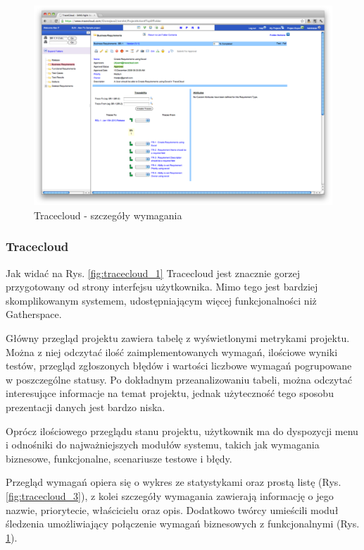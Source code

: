         \begin{figure}[t]
          \centering
          \includegraphics[width=1.0\textwidth]{img/tracecloud_4.pdf}
          \caption{Tracecloud - szczegóły wymagania}
          \label{fig:tracecloud_4}
        \end{figure}

      \subsubsection{Tracecloud}
        
        Jak widać na Rys. \ref{fig:tracecloud_1} Tracecloud jest znacznie gorzej przygotowany od strony interfejsu użytkownika. Mimo tego jest bardziej skomplikowanym systemem, udostępniającym więcej funkcjonalności niż Gatherspace.

        Główny przegląd projektu zawiera tabelę z wyświetlonymi metrykami projektu. Można z niej odczytać ilość zaimplementowanych wymagań, ilościowe wyniki testów, przegląd zgłoszonych błędów i wartości liczbowe wymagań pogrupowane w poszczególne statusy. Po dokładnym przeanalizowaniu tabeli, można odczytać interesujące informacje na temat projektu, jednak użyteczność tego sposobu prezentacji danych jest bardzo niska. 

        Oprócz ilościowego przeglądu stanu projektu, użytkownik ma do dyspozycji menu i odnośniki do najważniejszych modułów systemu, takich jak wymagania biznesowe, funkcjonalne, scenariusze testowe i błędy.

        Przegląd wymagań opiera się o wykres ze statystykami oraz prostą listę (Rys. \ref{fig:tracecloud_3}), z kolei szczegóły wymagania zawierają informację o jego nazwie, priorytecie, właścicielu oraz opis. Dodatkowo twórcy umieścili moduł śledzenia umożliwiający połączenie wymagań biznesowych z funkcjonalnymi (Rys. \ref{fig:tracecloud_4}).
    
